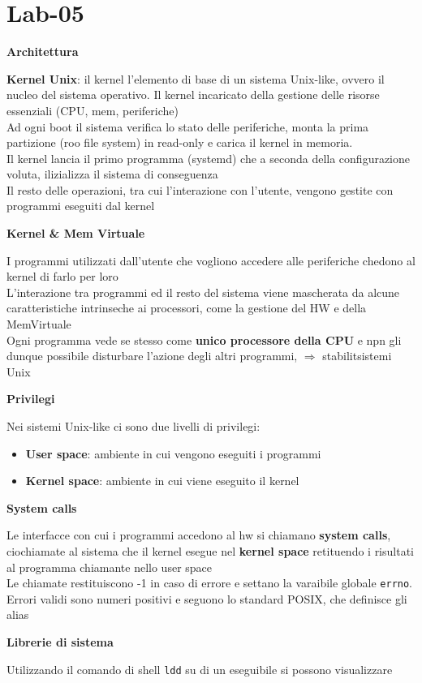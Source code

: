 \section{Lab-05}
\begin{flushleft}
  \textbf{Architettura}\\
  \begin{flushleft}
    \textbf{Kernel Unix}: il kernel \ace l'elemento di base di un sistema Unix-like, ovvero il nucleo 
    del sistema operativo. Il kernel \ace incaricato della gestione delle risorse essenziali (CPU, mem, periferiche) \\
    Ad ogni boot il sistema verifica lo stato delle periferiche, monta la prima partizione (roo file system) in read-only e 
    carica il kernel in memoria. \\ Il kernel lancia il primo programma (systemd) che a seconda 
    della configurazione voluta, ilizializza il sistema di conseguenza \\
    Il resto delle operazioni, tra cui l'interazione con l'utente, vengono gestite con programmi eseguiti dal kernel \par 
    \textbf{Kernel \& Mem Virtuale} \par 
    I programmi utilizzati dall'utente che vogliono accedere alle periferiche chedono al kernel di farlo per loro \\
    L'interazione tra programmi ed il resto del sistema viene mascherata da alcune caratteristiche intrinseche ai processori, come 
    la gestione del HW e della MemVirtuale \\
    Ogni programma vede se stesso come \textbf{unico processore della CPU} e npn gli \ace 
    dunque possibile disturbare l'azione degli altri programmi, $\Rightarrow$ stabilit\aca sistemi Unix \par 
    \textbf{Privilegi} \par 
    Nei sistemi Unix-like ci sono due livelli di privilegi:
    \begin{itemize}
      \item \textbf{User space}: ambiente in cui vengono eseguiti i programmi
      \item \textbf{Kernel space}: ambiente in cui viene eseguito il kernel
    \end{itemize}
  \end{flushleft}
  \begin{flushleft}
    \textbf{System calls} \par 
    Le interfacce con cui i programmi accedono al hw si chiamano \textbf{system calls}, cio\ace chiamate al sistema 
    che il kernel esegue nel \textbf{kernel space} retituendo i risultati al programma chiamante nello user space \\
    Le chiamate restituiscono -1 in caso di errore e settano la varaibile globale \texttt{errno}. Errori validi sono numeri 
    positivi e seguono lo standard POSIX, che definisce gli alias \par 
    \textbf{Librerie di sistema} \par 
    Utilizzando il comando di shell \texttt{ldd} su di un eseguibile si possono visualizzare
  \end{flushleft}
\end{flushleft}